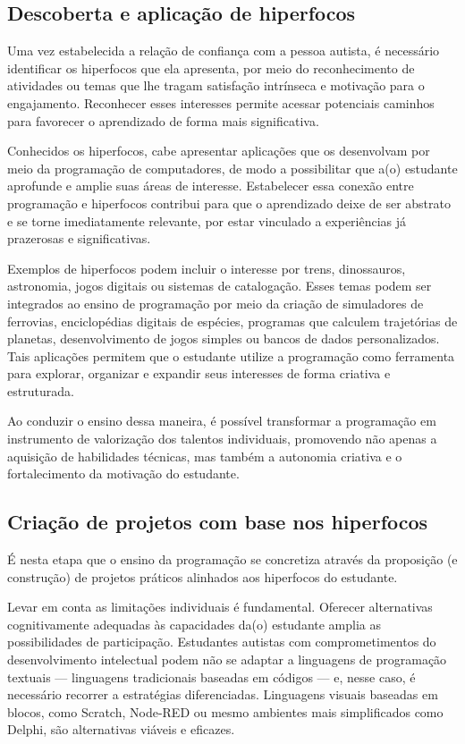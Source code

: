 \documentclass[
  12pt,
  a4paper,
]{article}
\begin{document}
\subsection{Descoberta e aplicação de
hiperfocos}\label{subsec:descoberta}

Uma vez estabelecida a relação de confiança com a pessoa autista, é
necessário identificar os hiperfocos que ela apresenta, por meio do
reconhecimento de atividades ou temas que lhe tragam satisfação
intrínseca e motivação para o engajamento. Reconhecer esses interesses
permite acessar potenciais caminhos para favorecer o aprendizado de
forma mais significativa.

Conhecidos os hiperfocos, cabe apresentar aplicações que os desenvolvam
por meio da programação de computadores, de modo a possibilitar que a(o)
estudante aprofunde e amplie suas áreas de interesse. Estabelecer essa
conexão entre programação e hiperfocos contribui para que o aprendizado
deixe de ser abstrato e se torne imediatamente relevante, por estar
vinculado a experiências já prazerosas e significativas.

Exemplos de hiperfocos podem incluir o interesse por trens, dinossauros,
astronomia, jogos digitais ou sistemas de catalogação. Esses temas podem
ser integrados ao ensino de programação por meio da criação de
simuladores de ferrovias, enciclopédias digitais de espécies, programas
que calculem trajetórias de planetas, desenvolvimento de jogos simples
ou bancos de dados personalizados. Tais aplicações permitem que o
estudante utilize a programação como ferramenta para explorar, organizar
e expandir seus interesses de forma criativa e estruturada.

Ao conduzir o ensino dessa maneira, é possível transformar a programação
em instrumento de valorização dos talentos individuais, promovendo não
apenas a aquisição de habilidades técnicas, mas também a autonomia
criativa e o fortalecimento da motivação do estudante.

\subsection{Criação de projetos com base nos
hiperfocos}\label{subsec:criacao}

É nesta etapa que o ensino da programação se concretiza através da
proposição (e construção) de projetos práticos alinhados aos hiperfocos
do estudante.

Levar em conta as limitações individuais é fundamental. Oferecer
alternativas cognitivamente adequadas às capacidades da(o) estudante
amplia as possibilidades de participação. Estudantes autistas com
comprometimentos do desenvolvimento intelectual podem não se adaptar a
linguagens de programação textuais --- linguagens tradicionais baseadas
em códigos --- e, nesse caso, é necessário recorrer a estratégias
diferenciadas. Linguagens visuais baseadas em blocos, como Scratch,
Node-RED ou mesmo ambientes mais simplificados como Delphi, são
alternativas viáveis e eficazes.
\end{document}
